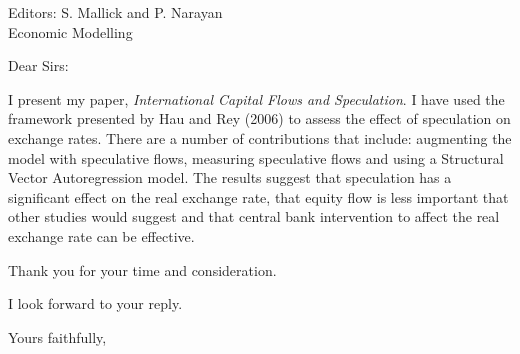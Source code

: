 \documentclass{letter}
\begin{document}
\begin{letter}{Editors: S. Mallick and P. Narayan \\
Economic Modelling} 


\opening{Dear Sirs:}

I present my paper, \emph{International Capital Flows and Speculation}. I have used the framework presented by Hau and Rey (2006) to assess the effect of speculation on exchange rates.  There are a number of contributions that include: augmenting the model with speculative flows, measuring speculative flows and using a Structural Vector Autoregression model.  The results suggest that speculation has a significant effect on the real exchange rate, that equity flow is less important that other studies would suggest and that central bank intervention to affect the real exchange rate can be effective.  

Thank you for your time and consideration. 

I look forward to your reply. 

\closing{Yours faithfully,}

\end{letter}
\end{document}
